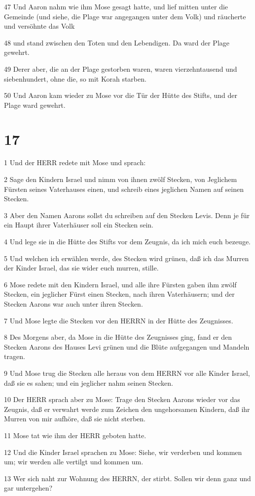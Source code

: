 \par 47 Und Aaron nahm wie ihm Mose gesagt hatte, und lief mitten unter die Gemeinde (und siehe, die Plage war angegangen unter dem Volk) und räucherte und versöhnte das Volk
\par 48 und stand zwischen den Toten und den Lebendigen. Da ward der Plage gewehrt.
\par 49 Derer aber, die an der Plage gestorben waren, waren vierzehntausend und siebenhundert, ohne die, so mit Korah starben.
\par 50 Und Aaron kam wieder zu Mose vor die Tür der Hütte des Stifts, und der Plage ward gewehrt.

\chapter{17}

\par 1 Und der HERR redete mit Mose und sprach:
\par 2 Sage den Kindern Israel und nimm von ihnen zwölf Stecken, von Jeglichem Fürsten seines Vaterhauses einen, und schreib eines jeglichen Namen auf seinen Stecken.
\par 3 Aber den Namen Aarons sollst du schreiben auf den Stecken Levis. Denn je für ein Haupt ihrer Vaterhäuser soll ein Stecken sein.
\par 4 Und lege sie in die Hütte des Stifts vor dem Zeugnis, da ich mich euch bezeuge.
\par 5 Und welchen ich erwählen werde, des Stecken wird grünen, daß ich das Murren der Kinder Israel, das sie wider euch murren, stille.
\par 6 Mose redete mit den Kindern Israel, und alle ihre Fürsten gaben ihm zwölf Stecken, ein jeglicher Fürst einen Stecken, nach ihren Vaterhäusern; und der Stecken Aarons war auch unter ihren Stecken.
\par 7 Und Mose legte die Stecken vor den HERRN in der Hütte des Zeugnisses.
\par 8 Des Morgens aber, da Mose in die Hütte des Zeugnisses ging, fand er den Stecken Aarons des Hauses Levi grünen und die Blüte aufgegangen und Mandeln tragen.
\par 9 Und Mose trug die Stecken alle heraus von dem HERRN vor alle Kinder Israel, daß sie es sahen; und ein jeglicher nahm seinen Stecken.
\par 10 Der HERR sprach aber zu Mose: Trage den Stecken Aarons wieder vor das Zeugnis, daß er verwahrt werde zum Zeichen den ungehorsamen Kindern, daß ihr Murren von mir aufhöre, daß sie nicht sterben.
\par 11 Mose tat wie ihm der HERR geboten hatte.
\par 12 Und die Kinder Israel sprachen zu Mose: Siehe, wir verderben und kommen um; wir werden alle vertilgt und kommen um.
\par 13 Wer sich naht zur Wohnung des HERRN, der stirbt. Sollen wir denn ganz und gar untergehen?

